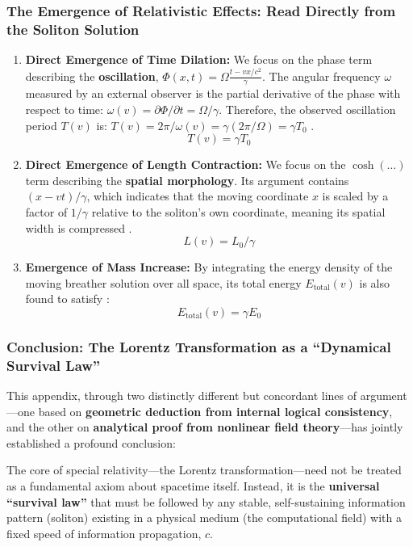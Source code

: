 \documentclass[11pt, a4paper]{article}
\begin{document}
\subsubsection{The Emergence of Relativistic Effects: Read Directly from the Soliton Solution}

\begin{enumerate}
    \item \textbf{Direct Emergence of Time Dilation:}
    We focus on the phase term describing the \textbf{oscillation}, $\Phi(x,t) = \Omega \frac{t - vx/c^2}{\gamma}$. The angular frequency $\omega$ measured by an external observer is the partial derivative of the phase with respect to time: $\omega(v) = \partial\Phi/\partial t = \Omega/\gamma$. Therefore, the observed oscillation period $T(v)$ is: $T(v) = 2\pi / \omega(v) = \gamma (2\pi/\Omega) = \gamma T_0$ \cite{Einstein1905}.
    \[
    \textbf{$T(v) = \gamma T_0$}
    \]

    \item \textbf{Direct Emergence of Length Contraction:}
    We focus on the $\cosh(\dots)$ term describing the \textbf{spatial morphology}. Its argument contains $(x - vt) / \gamma$, which indicates that the moving coordinate $x$ is scaled by a factor of $1/\gamma$ relative to the soliton's own coordinate, meaning its spatial width is compressed \cite{Einstein1905}.
    \[
    \textbf{$L(v) = L_0 / \gamma$}
    \]

    \item \textbf{Emergence of Mass Increase:}
    By integrating the energy density of the moving breather solution over all space, its total energy $E_{\text{total}}(v)$ is also found to satisfy \cite{Einstein1905}:
    \[
    \textbf{$E_{\text{total}}(v) = \gamma E_0$}
    \]
\end{enumerate}

\subsubsection{Conclusion: The Lorentz Transformation as a ``Dynamical Survival Law''}

This appendix, through two distinctly different but concordant lines of argument—one based on \textbf{geometric deduction from internal logical consistency}, and the other on \textbf{analytical proof from nonlinear field theory}—has jointly established a profound conclusion:

The core of special relativity—the Lorentz transformation—need not be treated as a fundamental axiom about spacetime itself. Instead, it is the \textbf{universal ``survival law''} that must be followed by any stable, self-sustaining information pattern (soliton) existing in a physical medium (the computational field) with a fixed speed of information propagation, $c$.
\end{document}

